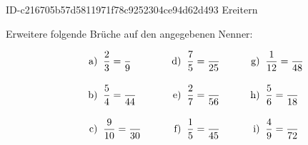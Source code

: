 \begin{exercise}
      {ID-c216705b57d5811971f78c9252304ce94d62d493}
      {Ereitern}
  \ifproblem\problem\par
    Erweitere folgende Brüche auf den
    angegebenen Nenner:
    \newcommand{\no}[1]
    {%
      \vphantom{\Bigg(}%
      \makebox[3em][r]%
      {%
        #1)%
      }%
      \;\;&%
    }%
    \begin{align*}
      \no{a} \frac{2}{3}=\frac{}{9}   & \no{d} \frac{7}{5}=\frac{}{25} & \no{g} \frac{1}{12}=\frac{}{48} \\
      \no{b} \frac{5}{4}=\frac{}{44}  & \no{e} \frac{2}{7}=\frac{}{56} & \no{h} \frac{5}{6}=\frac{}{18}  \\
      \no{c} \frac{9}{10}=\frac{}{30} & \no{f} \frac{1}{5}=\frac{}{45} & \no{i} \frac{4}{9}=\frac{}{72}
    \end{align*}
  \fi
\end{exercise}
